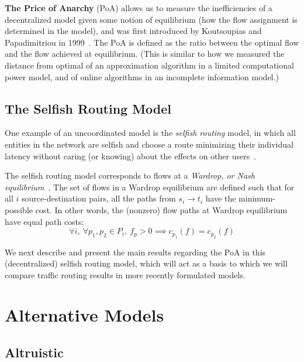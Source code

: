 \documentclass[acmlarge]{acmart}
\begin{document}
\medskip
\textbf{The Price of Anarchy} (PoA) allows us to measure the inefficiencies of a decentralized model given some notion of equilibrium (how the flow assignment is determined in the model), and was first introduced by Koutsoupias and Papadimitriou in 1999~\cite{poa}. 
The PoA is defined as the ratio between the optimal flow and the flow achieved
at equilibrium.
(This is similar to how we measured the distance from optimal of an approximation algorithm in a limited computational power model, and of online algorithms in an incomplete information model.)

\subsection{The Selfish Routing Model}
One example of an uncoordinated model is the \emph{selfish routing} model, in which all entities in the network are selfish and choose a route minimizing their individual latency without caring (or knowing) about the effects on other users~\cite{tardos}.

The selfish routing model corresponds to flows at a \emph{Wardrop, or Nash equilibrium}~\cite{wardrop,haurie}.
The set of flows in a Wardrop equilibrium are defined such that for all $i$ source-destination pairs, all the paths from $s_i \to t_i$ have the minimum-possible cost. In other words, the (nonzero) 
flow paths at Wardrop equilibrium have equal path costs: 
$$\forall i,~\forall p_1, p_2\in P_i,~f_p > 0 \implies c_{p_1}(f) = c_{p_2}(f)$$

We next describe and present the main results regarding the PoA in this (decentralized) selfish routing model, which will act as a basis to which we will compare traffic routing results in more recently formulated models.


\section{Alternative Models}

\subsection{Altruistic}
\end{document}
